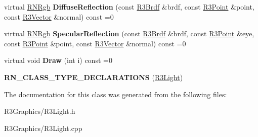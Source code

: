 \begin{DoxyCompactItemize}
\item 
virtual \hyperlink{class_r_n_rgb}{R\+N\+Rgb} {\bfseries Diffuse\+Reflection} (const \hyperlink{class_r3_brdf}{R3\+Brdf} \&brdf, const \hyperlink{class_r3_point}{R3\+Point} \&point, const \hyperlink{class_r3_vector}{R3\+Vector} \&normal) const  =0\hypertarget{class_r3_light_a0a0bf1256434ae1b56b659f1745b471c}{}\label{class_r3_light_a0a0bf1256434ae1b56b659f1745b471c}

\item 
virtual \hyperlink{class_r_n_rgb}{R\+N\+Rgb} {\bfseries Specular\+Reflection} (const \hyperlink{class_r3_brdf}{R3\+Brdf} \&brdf, const \hyperlink{class_r3_point}{R3\+Point} \&eye, const \hyperlink{class_r3_point}{R3\+Point} \&point, const \hyperlink{class_r3_vector}{R3\+Vector} \&normal) const  =0\hypertarget{class_r3_light_a32483a1d021730650d5fb4b923c09ee2}{}\label{class_r3_light_a32483a1d021730650d5fb4b923c09ee2}

\item 
virtual void {\bfseries Draw} (int i) const  =0\hypertarget{class_r3_light_acab9d89b70c14ca4af5b702a3c00c4b9}{}\label{class_r3_light_acab9d89b70c14ca4af5b702a3c00c4b9}

\item 
{\bfseries R\+N\+\_\+\+C\+L\+A\+S\+S\+\_\+\+T\+Y\+P\+E\+\_\+\+D\+E\+C\+L\+A\+R\+A\+T\+I\+O\+NS} (\hyperlink{class_r3_light}{R3\+Light})\hypertarget{class_r3_light_a14375a14186352b654dc75885dd02832}{}\label{class_r3_light_a14375a14186352b654dc75885dd02832}

\end{DoxyCompactItemize}


The documentation for this class was generated from the following files\+:\begin{DoxyCompactItemize}
\item 
R3\+Graphics/R3\+Light.\+h\item 
R3\+Graphics/R3\+Light.\+cpp\end{DoxyCompactItemize}
